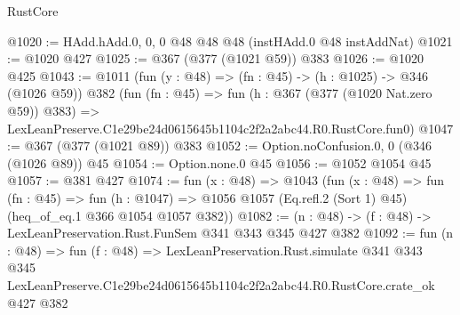 \begin{lexlean}{RustCore}
\begin{coremodule}
@1020 := HAdd.hAdd.{0, 0, 0} @48 @48 @48 (instHAdd.{0} @48 instAddNat)
@1021 := @1020 @427
@1025 := @367 (@377 (@1021 @59)) @383
@1026 := @1020 @425
@1043 := @1011
    (fun (y : @48) => (fn : @45) -> (h : @1025) -> @346 (@1026 @59))
    @382
    (fun (fn : @45) =>
    fun (h : @367 (@377 (@1020 Nat.zero @59)) @383) =>
    LexLeanPreserve.C1e29be24d0615645b1104c2f2a2abc44.R0.RustCore.fun0)
@1047 := @367 (@377 (@1021 @89)) @383
@1052 := Option.noConfusion.{0, 0} (@346 (@1026 @89)) @45
@1054 := Option.none.{0} @45
@1056 := @1052 @1054 @45
@1057 := @381 @427
@1074 := fun (x : @48) =>
  @1043
    (fun (x : @48) =>
    fun (fn : @45) =>
    fun (h : @1047) => @1056 @1057 (Eq.refl.{2} (Sort 1) @45) (heq_of_eq.{1} @366 @1054 @1057 @382))
@1082 := (n : @48) -> (f : @48) -> LexLeanPreservation.Rust.FunSem @341 @343 @345 @427 @382
@1092 := fun (n : @48) =>
  fun (f : @48) =>
  LexLeanPreservation.Rust.simulate
    @341
    @343
    @345
    LexLeanPreserve.C1e29be24d0615645b1104c2f2a2abc44.R0.RustCore.crate_ok
    @427
    @382
\end{coremodule}
\end{lexlean}

